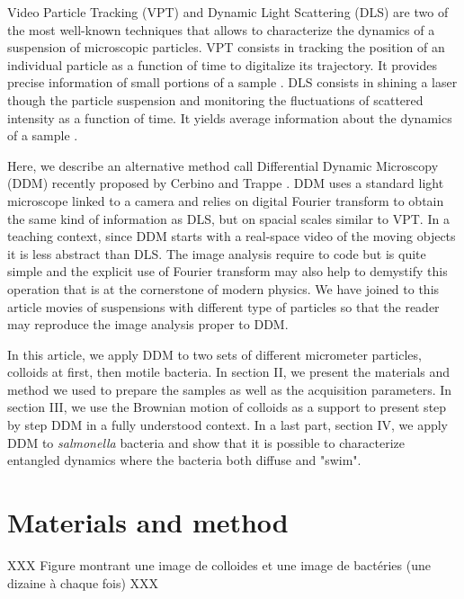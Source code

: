 \documentclass[%
 aip,
 jmp,%
 amsmath,amssymb,
reprint,%
]{revtex4-1}
\begin{document}
Video Particle Tracking (VPT) and Dynamic Light Scattering (DLS) are two of the most well-known techniques that allows to characterize the dynamics of a suspension of microscopic particles. VPT consists in tracking the position of an individual particle as a function of time to digitalize its trajectory. It provides precise information of small portions of a sample \citep{7_jaqaman2008robust}. DLS consists in shining a laser though the particle suspension and monitoring the fluctuations of scattered intensity as a function of time. It yields average information about the dynamics of a sample \citep{18_sartor2003dynamic}.



Here, we describe an alternative method call Differential Dynamic Microscopy (DDM) recently proposed by Cerbino and Trappe \cite{XXX}. DDM uses a standard light microscope linked to a camera and relies on digital Fourier transform to obtain the same kind of information as DLS, but on spacial scales similar to VPT. In a teaching context, since DDM starts with a real-space video of the moving objects it is less abstract than DLS. The image analysis require to code but is quite simple and the explicit use of Fourier transform may also help to demystify this operation that is at the cornerstone of modern physics. We have joined to this article movies of suspensions with different type of particles so that the reader may reproduce the image analysis proper to DDM.


In this article, we apply DDM to two sets of different micrometer particles, colloids at first, then motile bacteria. In section II, we present the materials and method we used to prepare the samples as well as the acquisition parameters. In section III, we use the Brownian motion of colloids as a support to present step by step DDM in a fully understood context. In a last part, section IV, we apply DDM to \textit{salmonella} bacteria and show that it is possible to characterize entangled dynamics where the bacteria both diffuse and "swim".

\section{Materials and method}


XXX Figure montrant une image de colloides et une image de bactéries (une dizaine à chaque fois) XXX
\end{document}
